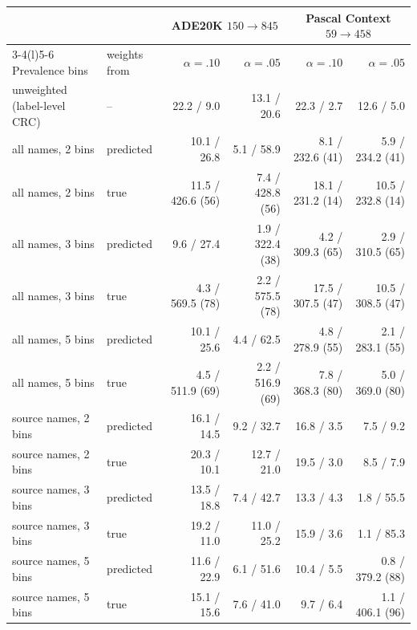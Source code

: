 \begin{tabular}{@{}llrrrr@{}}
\toprule
& & \multicolumn{2}{c}{ADE20K $150\!\to\!845$} & \multicolumn{2}{c}{Pascal Context $59\!\to\!458$} \\
\cmidrule(lr){3-4}\cmidrule(l){5-6}
Prevalence bins & weights from & $\alpha=.10$ & $\alpha=.05$ & $\alpha=.10$ & $\alpha=.05$ \\
\midrule
unweighted (label-level CRC) & -- & 22.2 / 9.0 & 13.1 / 20.6 & 22.3 / 2.7 & 12.6 / 5.0 \\
\midrule
all names, 2 bins & predicted & 10.1 / 26.8 & 5.1 / 58.9 & 8.1 / 232.6 (41) & 5.9 / 234.2 (41) \\
all names, 2 bins & true & 11.5 / 426.6 (56) & 7.4 / 428.8 (56) & 18.1 / 231.2 (14) & 10.5 / 232.8 (14) \\
all names, 3 bins & predicted & 9.6 / 27.4 & 1.9 / 322.4 (38) & 4.2 / 309.3 (65) & 2.9 / 310.5 (65) \\
all names, 3 bins & true & 4.3 / 569.5 (78) & 2.2 / 575.5 (78) & 17.5 / 307.5 (47) & 10.5 / 308.5 (47) \\
all names, 5 bins & predicted & 10.1 / 25.6 & 4.4 / 62.5 & 4.8 / 278.9 (55) & 2.1 / 283.1 (55) \\
all names, 5 bins & true & 4.5 / 511.9 (69) & 2.2 / 516.9 (69) & 7.8 / 368.3 (80) & 5.0 / 369.0 (80) \\
source names, 2 bins & predicted & 16.1 / 14.5 & 9.2 / 32.7 & 16.8 / 3.5 & 7.5 / 9.2 \\
source names, 2 bins & true & 20.3 / 10.1 & 12.7 / 21.0 & 19.5 / 3.0 & 8.5 / 7.9 \\
source names, 3 bins & predicted & 13.5 / 18.8 & 7.4 / 42.7 & 13.3 / 4.3 & 1.8 / 55.5 \\
source names, 3 bins & true & 19.2 / 11.0 & 11.0 / 25.2 & 15.9 / 3.6 & 1.1 / 85.3 \\
source names, 5 bins & predicted & 11.6 / 22.9 & 6.1 / 51.6 & 10.4 / 5.5 & 0.8 / 379.2 (88) \\
source names, 5 bins & true & 15.1 / 15.6 & 7.6 / 41.0 & 9.7 / 6.4 & 1.1 / 406.1 (96) \\
\bottomrule
\end{tabular}
